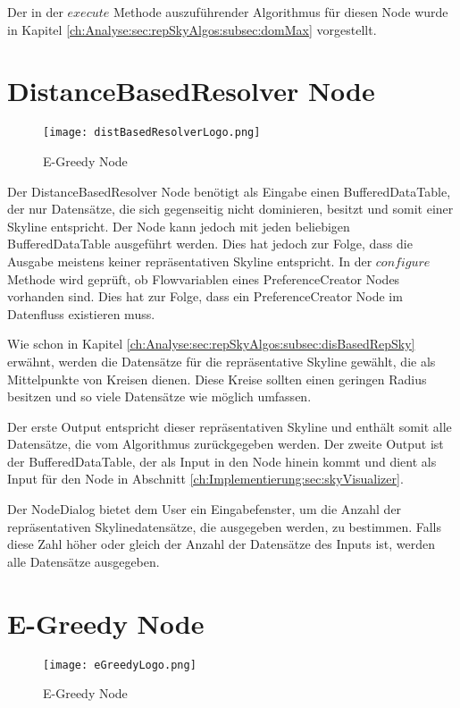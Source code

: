Der in der $execute$ Methode auszuführender Algorithmus für diesen Node wurde in Kapitel \ref{ch:Analyse:sec:repSkyAlgos:subsec:domMax} vorgestellt. 
\section{DistanceBasedResolver Node}
\label{ch:Implementierung:sec:distBasedResolverNode}
\begin{figure}[H]
	\centering
	\texttt{[image: distBasedResolverLogo.png]}
	\caption{E-Greedy Node}
	\label{img:distBasedResolverLogo}
\end{figure}

Der DistanceBasedResolver Node benötigt als Eingabe einen BufferedDataTable, der nur Datensätze, die sich gegenseitig nicht dominieren, besitzt und somit einer Skyline entspricht. Der Node kann jedoch mit jeden beliebigen BufferedDataTable ausgeführt werden. Dies hat jedoch zur Folge, dass die Ausgabe meistens keiner repräsentativen Skyline entspricht. In der $configure$ Methode wird geprüft, ob Flowvariablen eines PreferenceCreator Nodes vorhanden sind. Dies hat zur Folge, dass ein PreferenceCreator Node im Datenfluss existieren muss.

Wie schon in Kapitel \ref{ch:Analyse:sec:repSkyAlgos:subsec:disBasedRepSky} erwähnt, werden die Datensätze für die repräsentative Skyline gewählt, die als Mittelpunkte von Kreisen dienen. Diese Kreise sollten einen geringen Radius besitzen und so viele Datensätze wie möglich umfassen.  

Der erste Output entspricht dieser repräsentativen Skyline und enthält somit alle Datensätze, die vom Algorithmus zurückgegeben werden. Der zweite Output ist der BufferedDataTable, der als Input in den Node hinein kommt und dient als Input für den Node in Abschnitt \ref{ch:Implementierung:sec:skyVisualizer}.

Der NodeDialog bietet dem User ein Eingabefenster, um die Anzahl der repräsentativen Skylinedatensätze, die ausgegeben werden, zu bestimmen. Falls diese Zahl höher oder gleich der Anzahl der Datensätze des Inputs ist, werden alle Datensätze ausgegeben.
\section{E-Greedy Node}
\label{ch:Implementierung:sec:eGreedyNode}
\begin{figure}[H]
	\centering
	\texttt{[image: eGreedyLogo.png]}
	\caption{E-Greedy Node}
	\label{img:eGreedyLogo}
\end{figure}

